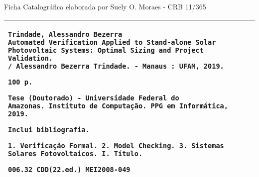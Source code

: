 \thispagestyle{plain}
%    
%    
%    
%
%
\thispagestyle{empty}
\null\vfill

\begin{center}
Ficha Catalográfica elaborada por Suely O. Moraes - CRB 11/365
\begin{tabular}{|p{12.5cm}|}%
\hline
\begin{small}
\begin{verbatim}
Trindade, Alessandro Bezerra
Automated Verification Applied to Stand-alone Solar 
Photovoltaic Systems: Optimal Sizing and Project Validation. 
/ Alessandro Bezerra Trindade. - Manaus : UFAM, 2019.

100 p.

Tese (Doutorado) - Universidade Federal do
Amazonas. Instituto de Computação. PPG em Informática, 2019.

Inclui bibliografia.

1. Verificação Formal. 2. Model Checking. 3. Sistemas
Solares Fotovoltaicos. I. Título.

006.32 CDD(22.ed.) MEI2008-049
\end{verbatim}
\end{small}
\\ \hline
\end{tabular}
\end{center}

\thispagestyle{plain}